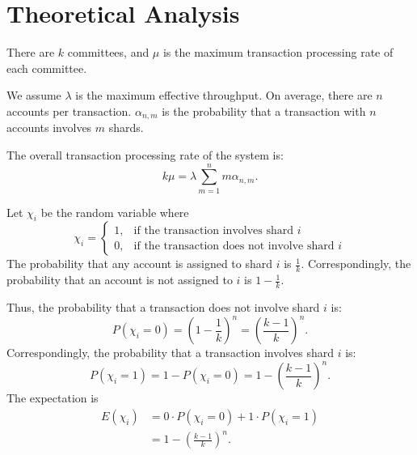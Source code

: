 \documentclass[10pt, conference, letterpaper]{IEEEtran}
\begin{document}
\section{Theoretical Analysis}
There are $k$ committees,  and $\mu$ is the maximum transaction processing rate of each committee.

We assume $\lambda$ is the maximum effective throughput. 
On average, there are  $n$ accounts per transaction. $\alpha_{n,m}$ is the probability that a transaction with $n$ accounts involves $m$ shards. 

The overall transaction processing rate of the system is:
\begin{equation} \label{equ1}
	k\mu=\lambda \sum_{m=1}^n m \alpha_{n,m}. 	
\end{equation}


Let $ \chi_i$ be the random variable where
\begin{equation}
	\chi_i=
	\begin{cases} 
		1, & \mbox{if the transaction involves  shard $i$}          \\
		0, & \mbox{if the transaction does not involve   shard $i$}
	\end{cases}
\end{equation}
The probability that any account is assigned to shard $i$ is $\frac{1}{k}$. Correspondingly, the probability that an account is not assigned to $i$ is $1-\frac{1}{k}$. 

Thus, the probability that a transaction does not involve shard $i$ is:
\begin{equation}
	P( \chi_i=0)=\left(1-\frac{1}{k}\right)^n=\left(\frac{k-1}{k}\right)^n.
\end{equation}
Correspondingly, the probability that a transaction involves shard $i$ is:
\begin{equation}
	P( \chi_i=1)=1-P( \chi_i=0)=1-\left(\frac{k-1}{k}\right)^n.
\end{equation}
The expectation is
\begin{equation}
	\begin{split}
		E( \chi_i )&= 0\cdot P( \chi_i=0)+1 \cdot P( \chi_i=1)\\
		&=1-\left(\frac{k-1}{k}\right)^n.
	\end{split}
\end{equation}
\end{document}
